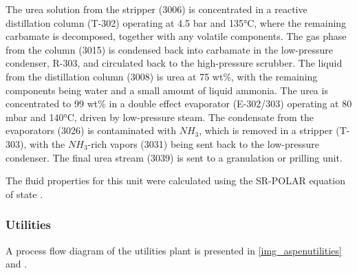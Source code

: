 \documentclass[a4paper, titlepage]{article}
\begin{document}
The urea solution from the stripper (3006) is concentrated in a reactive distillation column (T-302) operating at
4.5 bar and 135°C, where the remaining carbamate is decomposed, together with any volatile components. The gas phase
from the column (3015) is condensed back into carbamate in the low-pressure condenser, R-303, and circulated back to
the high-pressure scrubber. The liquid from the distillation column (3008) is urea at 75 wt\%, with the remaining
components being water and a small amount of liquid ammonia. The urea is concentrated to 99 wt\% in a double effect
evaporator (E-302/303) operating at 80 mbar and 140°C, driven by low-pressure steam. The condensate from the
evaporators (3026) is contaminated with $NH_3$, which is removed in a stripper (T-303), with the $NH_3$-rich vapors
(3031) being sent back to the low-pressure condenser. The final urea stream (3039) is sent to a granulation or
prilling unit.

The fluid properties for this unit were calculated using the SR-POLAR equation of state
\cite{aspentechASPEN88Technical2011}.

\subsubsection{Utilities}

A process flow diagram of the utilities plant is presented in \autoref{img_aspenutilities} and
.
\end{document}
